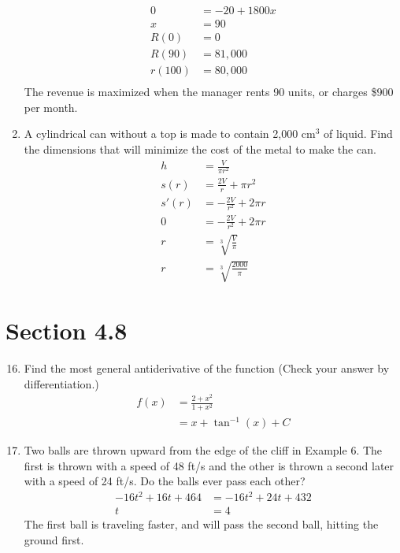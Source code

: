 \documentclass{article}
\begin{document}
\begin{enumerate}
$$\begin{align}
		0&=-20+1800x\\
		x&=90\\
		R(0)&=0\\
		R(90)&=81,000\\
		r(100)&=80,000\\
	\end{align}$$
	The revenue is maximized when the manager rents 90 units, or charges \$900 per month.
\setcounter{enumi}{21}
	\item A cylindrical can without a top is made to contain 2,000 cm$^3$ of liquid. Find the dimensions that will minimize the cost of the metal to make the can.
	$$\begin{align}
		h&=\frac{V}{\pi r^2}\\
		s(r)&=\frac{2V}{r}+\pi r^2\\
		s'(r)&=-\frac{2V}{r^2}+2\pi r\\
		0&=-\frac{2V}{r^2}+2\pi r\\
		r&=\sqrt[3]{\frac{V}{\pi}}\\
		r&=\boxed{\sqrt[3]{\frac{2000}{\pi}}}
	\end{align}$$
\end{enumerate}

\section{Section 4.8}
\begin{enumerate}
\setcounter{enumi}{15}
	\item Find the most general antiderivative of the function (Check your answer by differentiation.) $$\begin{align}
		f(x)&=\frac{2+x^2}{1+x^2}\\
		&=x+\tan^{-1}(x)+C
	\end{align}$$
\setcounter{enumi}{45}
	\item Two balls are thrown upward from the edge of the cliff in Example 6. The first is thrown with a speed of 48 ft/s and the other is thrown a second later with a speed of 24 ft/s. Do the balls ever pass each other?
	$$\begin{align}
		-16t^2+16t+464&=-16t^2+24t+432\\
		t&=4
	\end{align}$$
	The first ball is traveling faster, and will pass the second ball, hitting the ground first.
\end{enumerate}
\end{document}
